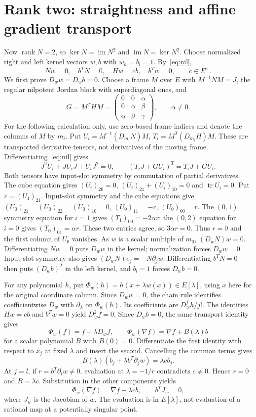 \documentclass[11pt,a4paper]{article}
\newcommand{\rank}{\operatorname{rank}}
\newcommand{\im}{\operatorname{im}}
\begin{document}
\section{Rank two: straightness and affine gradient transport}
Now $\rank N=2$, so $\ker N=\im N^2$ and $\im N=\ker N^2$. Choose normalized right and left kernel vectors $w,b$ with $w_k=b_l=1$. By~\eqref{eq:nil},
\[
 Nw=0,\quad b^TN=0,\quad Hw=cb,\quad b^Tw=0,
 \qquad c\in E^\times.
\]
We first prove $D_ww=D_wb=0$. Choose a frame $M$ over $E$ with $M^{-1}NM=J$, the regular nilpotent Jordan block with superdiagonal ones, and
\[
 G=M^THM=\begin{pmatrix}0&0&\alpha\\0&\alpha&\beta\\\alpha&\beta&\gamma\end{pmatrix},\qquad\alpha\ne0.
\]
For the following calculation only, use zero-based frame indices and denote the columns of $M$ by $m_i$. Put $U_i=M^{-1}(D_{m_i}N)M$, $T_i=M^T(D_{m_i}H)M$. These are transported derivative tensors, not derivatives of the moving frame. Differentiating~\eqref{eq:nil} gives
\[
 J^2U_i+JU_iJ+U_iJ^2=0,\qquad (T_iJ+GU_i)^T=T_iJ+GU_i.
\]
Both tensors have input-slot symmetry by commutation of partial derivatives. The cube equation gives $(U_i)_{20}=0$, $(U_i)_{21}+(U_i)_{10}=0$ and $\operatorname{tr} U_i=0$. Put $r=(U_1)_{21}$. Input-slot symmetry and the cube equations give $(U_0)_{21}=(U_0)_{22}=(U_0)_{10}=0$, $(U_0)_{11}=-r$, $(U_0)_{00}=r$. The $(0,1)$ symmetry equation for $i=1$ gives $(T_1)_{00}=-2\alpha r$; the $(0,2)$ equation for $i=0$ gives $(T_0)_{01}=\alpha r$. These two entries agree, so $3\alpha r=0$. Thus $r=0$ and the first column of $U_0$ vanishes. As $w$ is a scalar multiple of $m_0$, $(D_wN)w=0$. Differentiating $Nw=0$ puts $D_ww$ in the kernel; normalization forces $D_ww=0$. Input-slot symmetry also gives $(D_wN)e_j=-N\partial_jw$. Differentiating $b^TN=0$ then puts $(D_wb)^T$ in the left kernel, and $b_l=1$ forces $D_wb=0$.

For any polynomial $h$, put $\Phi_w(h)=h(x+\lambda w(x))\in E[\lambda]$, using $x$ here for the original coordinate column. Since $D_ww=0$, the chain rule identifies coefficientwise $D_w$ with $\partial_\lambda$ on $\Phi_w(h)$. Its coefficients are $D_w^jh/j!$. The identities $Hw=cb$ and $b^Tw=0$ yield $D_w^2f=0$. Since $D_wb=0$, the same transport identity gives
\[
 \Phi_w(f)=f+\lambda D_wf,\qquad
 \Phi_w(\nabla f)=\nabla f+B(\lambda)b
\]
for a scalar polynomial $B$ with $B(0)=0$. Differentiate the first identity with respect to $x_j$ at fixed $\lambda$ and insert the second. Cancelling the common terms gives
\begin{equation}\label{eq:transport}
 B(\lambda)(b_j+\lambda b^T\partial_j w)=\lambda c b_j.
\end{equation}
At $j=l$, if $r=b^T\partial_lw\ne0$, evaluation at $\lambda=-1/r$ contradicts $c\ne0$. Hence $r=0$ and $B=\lambda c$. Substitution in the other components yields
\begin{equation}\label{eq:key}
 \boxed{\Phi_w(\nabla f)=\nabla f+\lambda cb,\qquad b^TJ_w=0,}
\end{equation}
where $J_w$ is the Jacobian of $w$. The evaluation is in $E[\lambda]$, not evaluation of a rational map at a potentially singular point.
\end{document}
